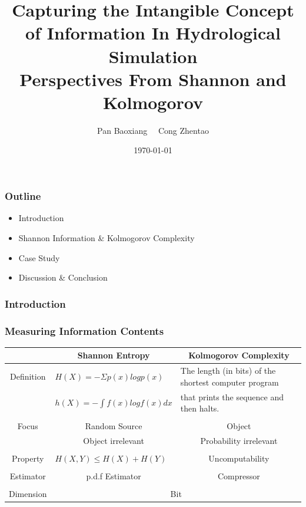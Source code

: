 \documentclass{beamer}
\begin{document}
\begin{CJK}{UTF8}{gkai} 

\title{Capturing the Intangible Concept of Information In Hydrological Simulation\\\raisebox{0.5mm}{------}Perspectives From Shannon and Kolmogorov}
\author{Pan Baoxiang \  \ Cong Zhentao}
\date{\today}
\maketitle
\begin{frame}
\frametitle{Outline}
\begin{itemize}
\item Introduction
\item Shannon Information \& Kolmogorov Complexity
\item Case Study 
\item Discussion \& Conclusion
\end{itemize}
\end{frame}

\begin{frame}
\frametitle{Introduction}

 

\end{frame}

\begin{frame}
\frametitle{Measuring Information Contents}
 
\begin{tabular}{c p{4.4cm}  p{4.3cm} }
\toprule
&\multicolumn{1}{c}{Shannon Entropy}&\multicolumn{1}{c}{Kolmogorov Complexity} \\ \hline
Definition & 
$H(X)=-\Sigma p(x)logp(x)$ & The length (in bits) of the shortest computer program \\ 
&$h(X)=-\int f(x)logf(x)dx$&that prints the sequence and then halts.\\ 
\\
Focus&\multicolumn{1}{c}{Random Source}&\multicolumn{1}{c}{Object}\\
&\multicolumn{1}{c}{Object irrelevant}&\multicolumn{1}{c}{Probability irrelevant}\\
\\
Property&$H(X,Y)\leq H(X)+H(Y)$&\multicolumn{1}{c}{Uncomputability}\\
\\
Estimator&\multicolumn{1}{c}{p.d.f Estimator}&\multicolumn{1}{c}{Compressor}\\
\\
Dimension&\multicolumn{2}{c}{Bit}\\
\hline
\end{tabular}
 


\end{frame}
\end{CJK}
\end{document}
